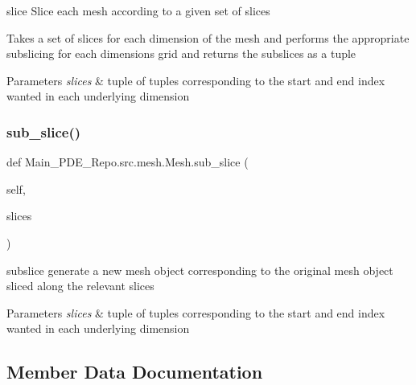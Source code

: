 slice Slice each mesh according to a given set of slices 

Takes a set of slices for each dimension of the mesh and performs the appropriate subslicing for each dimension\textquotesingle{}s grid and returns the subslices as a tuple 
\begin{DoxyParams}{Parameters}
{\em slices} & tuple of tuples corresponding to the start and end index wanted in each underlying dimension \\
\hline
\end{DoxyParams}
\mbox{\label{classMain__PDE__Repo_1_1src_1_1mesh_1_1Mesh_adfbc08946443424b523a771ca67a7009}} 
\subsubsection{\texorpdfstring{sub\+\_\+slice()}{sub\_slice()}}
{\footnotesize\ttfamily def Main\+\_\+\+P\+D\+E\+\_\+\+Repo.\+src.\+mesh.\+Mesh.\+sub\+\_\+slice (\begin{DoxyParamCaption}\item[{}]{self,  }\item[{}]{slices }\end{DoxyParamCaption})}



subslice generate a new mesh object corresponding to the original mesh object sliced along the relevant slices 


\begin{DoxyParams}{Parameters}
{\em slices} & tuple of tuples corresponding to the start and end index wanted in each underlying dimension \\
\hline
\end{DoxyParams}


\subsection{Member Data Documentation}
\mbox{\label{classMain__PDE__Repo_1_1src_1_1mesh_1_1Mesh_a1da23a0977d75b18603c49d2c7bf59ba}} 
